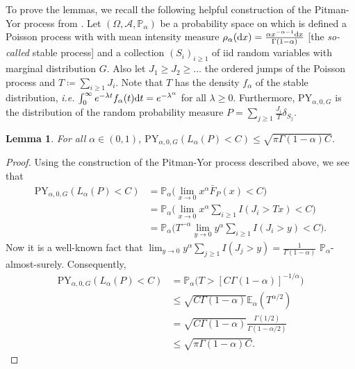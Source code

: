 \documentclass{article}
\newtheorem{lemma}{Lemma}
\newcommand{\1}{\boldsymbol{1}}
\newcommand{\EE}{\mathbb{E}}
\newcommand{\PP}{\mathbb{P}}
\theoremstyle{plain}
\begin{document}
To prove the lemmas, we recall the following helpful construction of the Pitman-Yor process from \cite[Example~14.47]{Gho(17)}. Let $(\Omega,\mathcal{A},\PP_{\alpha})$ be a probability space on which is defined a Poisson process with with mean intensity measure $\rho_{\alpha}(\mathrm{d} x) = \frac{\alpha x^{-\alpha-1}\mathrm{d} x}{\Gamma(1-\alpha)}$ [the \textit{so-called} stable process] and a collection $(S_i)_{i\geq 1}$ of iid random variables with marginal distribution $G$. Also let $J_1 \geq J_2 \geq \dots$
the ordered jumps of the Poisson process and $T \coloneqq \sum_{i\geq 1}J_i$. Note that $T$ has the density  $f_{\alpha}$ of the stable distribution, \textit{i.e.} $\int_0^{\infty}e^{-\lambda t} f_{\alpha}(t)\mathrm{d} t = e^{-\lambda^{\alpha}}$ for all $\lambda \geq 0$. Furthermore, $\mathrm{PY}_{\alpha,0,G}$ is the distribution of the random probability measure $P = \sum_{j\geq 1}\frac{J_i}{T}\delta_{S_j}$.%

\begin{lemma}
  \label{lem:1a}
  For all $\alpha \in (0,1)$, $\mathrm{PY}_{\alpha,0,G}(L_{\alpha}(P) < C )  \leq \sqrt{\pi\Gamma(1-\alpha)C}$.
\end{lemma}
\begin{proof}
  Using the construction of the Pitman-Yor process described above, we see that
  \begin{align*}
    \mathrm{PY}_{\alpha,0,G}(L_{\alpha}(P)< C )%
    &= \PP_{\alpha}\Big(\lim_{x\to 0}x^{\alpha}\bar{F}_P(x) < C \Big)\\
    &= \PP_{\alpha}\Big(\lim_{x\to 0}x^{\alpha}\sum_{i\geq 1}I(J_i > T x)  < C\Big)\\
    &= \PP_{\alpha}\Big(T^{-\alpha}\lim_{y\to 0}y^{\alpha}\sum_{i\geq 1}I(J_i > y) < C\Big).%
  \end{align*}
  Now it is a well-known fact that $\lim_{y\to 0}y^{\alpha} \sum_{j\geq 1}I(J_j > y) = \frac{1}{\Gamma(1-\alpha)}$ $\PP_{\alpha}$-almost-surely. Consequently,
  \begin{align*}
    \mathrm{PY}_{\alpha,0,G}(L_{\alpha}(P) < C)%
    &= \PP_{\alpha}\big(T > [C\Gamma(1-\alpha)]^{-1/\alpha} \big)\\
    &\leq \sqrt{C\Gamma(1-\alpha)}\EE_{\alpha}(T^{\alpha/2})\\
    &= \sqrt{C\Gamma(1-\alpha)}\frac{\Gamma(1/2)}{\Gamma(1-\alpha/2)}\\
    &\leq \sqrt{\pi\Gamma(1-\alpha)C}.
  \end{align*}%
\end{proof}
\end{document}
